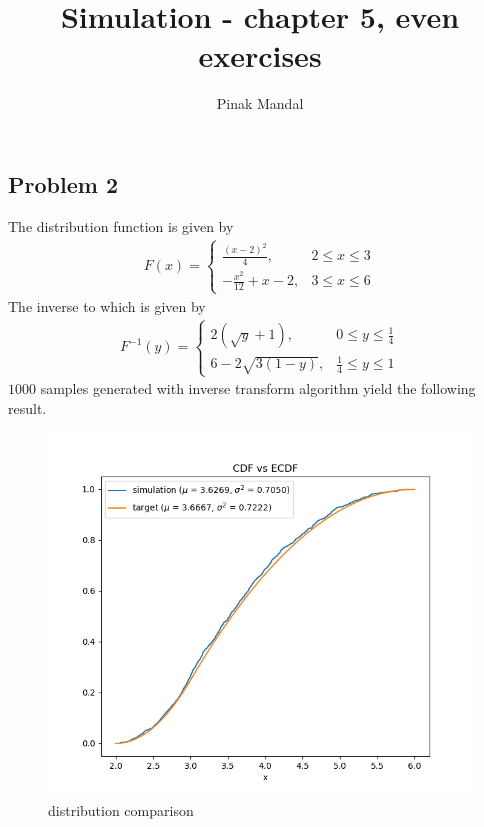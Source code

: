 \documentclass{article}
\title{Simulation - chapter 5, even exercises}
\author{Pinak Mandal}
\date{}
\begin{document}
\subsection*{Problem 2}
The distribution function is given by
\begin{align*}
  F(x) = \begin{cases}
            \frac{(x-2)^2}{4}, & 2\le x\le 3 \\
            -\frac{x^2}{12} + x - 2, & 3\le x\le 6
        \end{cases}
\end{align*}
The inverse to which is given by
\begin{align*}
  F^{-1}(y) = \begin{cases}
                2(\sqrt{y}+1), & 0\le y\le \frac{1}{4}\\
                6-2\sqrt{3(1-y)}, & \frac{1}{4}\le y\le 1
              \end{cases}
\end{align*}
$1000$ samples generated with inverse transform algorithm yield the following result.
\begin{figure}[h!]
    \centering
    \includegraphics[width=\linewidth]{../images/p2_1000.png}
    \caption{distribution comparison}
\end{figure}
\newpage
\end{document}
